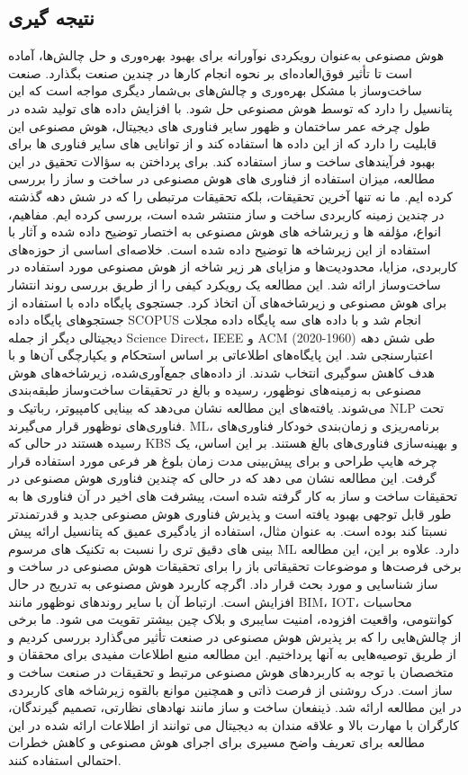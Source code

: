 \documentclass[towcolumn, 11pt]{Article}
\begin{document}
\begin{چکیده}
\section{نتیجه گیری}
هوش مصنوعی به‌عنوان رویکردی نوآورانه برای بهبود بهره‌وری و حل چالش‌ها، آماده است تا تأثیر فوق‌العاده‌ای بر نحوه انجام کارها در چندین صنعت بگذارد. صنعت ساخت‌وساز با مشکل بهره‌وری و چالش‌های بی‌شمار دیگری مواجه است که این پتانسیل را دارد که توسط هوش مصنوعی حل شود. با افزایش داده های تولید شده در طول چرخه عمر ساختمان و ظهور سایر فناوری های دیجیتال، هوش مصنوعی این قابلیت را دارد که از این داده ها استفاده کند و از توانایی های سایر فناوری ها برای بهبود فرآیندهای ساخت و ساز استفاده کند. برای پرداختن به سؤالات تحقیق در این مطالعه، میزان استفاده از فناوری های هوش مصنوعی در ساخت و ساز را بررسی کرده ایم. ما نه تنها آخرین تحقیقات، بلکه تحقیقات مرتبطی را که در شش دهه گذشته در چندین زمینه کاربردی ساخت و ساز منتشر شده است، بررسی کرده ایم. مفاهیم، انواع، مؤلفه ها و زیرشاخه های هوش مصنوعی به اختصار توضیح داده شده و آثار با استفاده از این زیرشاخه ها توضیح داده شده است. خلاصه‌ای اساسی از حوزه‌های کاربردی، مزایا، محدودیت‌ها و مزایای هر زیر شاخه از هوش مصنوعی مورد استفاده در ساخت‌وساز ارائه شد.
این مطالعه یک رویکرد کیفی را از طریق بررسی روند انتشار برای هوش مصنوعی و زیرشاخه‌های آن اتخاذ کرد. جستجوی پایگاه داده با استفاده از جستجوهای پایگاه داده SCOPUS انجام شد و با داده های سه پایگاه داده مجلات دیجیتالی دیگر از جمله Science Direct، IEEE و ACM طی شش دهه (1960-2020) اعتبارسنجی شد.
این پایگاه‌های اطلاعاتی بر اساس استحکام و یکپارچگی آن‌ها و با هدف کاهش سوگیری انتخاب شدند. از داده‌های جمع‌آوری‌شده، زیرشاخه‌های هوش مصنوعی به زمینه‌های نوظهور، رسیده و بالغ در تحقیقات ساخت‌وساز طبقه‌بندی می‌شوند. یافته‌های این مطالعه نشان می‌دهد که بینایی کامپیوتر، رباتیک و NLP تحت فناوری‌های نوظهور قرار می‌گیرند. ML، برنامه‌ریزی و زمان‌بندی خودکار فناوری‌های رسیده هستند در حالی که KBS و بهینه‌سازی فناوری‌های بالغ هستند. بر این اساس، یک چرخه هایپ طراحی و برای پیش‌بینی مدت زمان بلوغ هر فرعی مورد استفاده قرار گرفت. این مطالعه نشان می دهد که در حالی که چندین فناوری هوش مصنوعی در تحقیقات ساخت و ساز به کار گرفته شده است، پیشرفت های اخیر در آن فناوری ها به طور قابل توجهی بهبود یافته است و پذیرش فناوری هوش مصنوعی جدید و قدرتمندتر نسبتا کند بوده است. به عنوان مثال، استفاده از یادگیری عمیق که پتانسیل ارائه پیش بینی های دقیق تری را نسبت به تکنیک های مرسوم ML دارد.
علاوه بر این، این مطالعه برخی فرصت‌ها و موضوعات تحقیقاتی باز را برای تحقیقات هوش مصنوعی در ساخت و ساز شناسایی و مورد بحث قرار داد. اگرچه کاربرد هوش مصنوعی به تدریج در حال افزایش است. ارتباط آن با سایر روندهای نوظهور مانند BIM، IOT، محاسبات کوانتومی، واقعیت افزوده، امنیت سایبری و بلاک چین بیشتر تقویت می شود. ما برخی از چالش‌هایی را که بر پذیرش هوش مصنوعی در صنعت تأثیر می‌گذارد بررسی کردیم و از طریق توصیه‌هایی به آنها پرداختیم. این مطالعه منبع اطلاعات مفیدی برای محققان و متخصصان با توجه به کاربردهای هوش مصنوعی مرتبط و تحقیقات در صنعت ساخت و ساز است. درک روشنی از فرصت ذاتی و همچنین موانع بالقوه زیرشاخه های کاربردی در این مطالعه ارائه شد. ذینفعان ساخت و ساز مانند نهادهای نظارتی، تصمیم گیرندگان، کارگران با مهارت بالا و علاقه مندان به دیجیتال می توانند از اطلاعات ارائه شده در این مطالعه برای تعریف واضح مسیری برای اجرای هوش مصنوعی و کاهش خطرات احتمالی استفاده کنند.





\end{چکیده}
\end{document}
